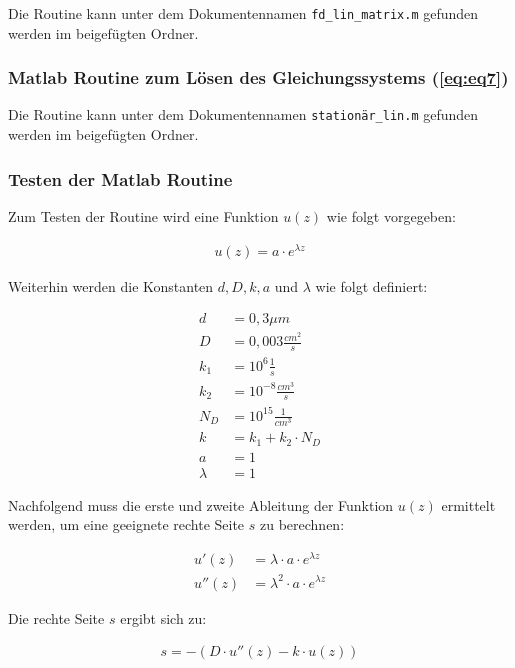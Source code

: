\documentclass[
	pagesize,
	fontsize=12pt,
	paper=a4,
	oneside,
   reqno
]{scrartcl}
\begin{document}
Die Routine kann unter dem Dokumentennamen \texttt{fd\_lin\_matrix.m} gefunden werden im beigefügten Ordner.

\subsubsection{Matlab Routine zum Lösen des Gleichungssystems (\autoref{eq:eq7})}

Die Routine kann unter dem Dokumentennamen \texttt{stationär\_lin.m} gefunden werden im beigefügten Ordner.

\subsubsection{Testen der Matlab Routine}

Zum Testen der Routine wird eine Funktion $u(z)$ wie folgt vorgegeben:

\begin{align*}
   u(z) = a \cdot e^{\lambda z}
\end{align*}

Weiterhin werden die Konstanten $d, D, k, a$ und $\lambda$ wie folgt definiert:

\begin{align*}
   d &= 0,3\mu m \\
   D &= 0,003 \frac{cm^2}{s} \\
   k_1 &= 10^6 \frac{1}{s} \\
   k_2 &= 10^{-8} \frac{cm^3}{s} \\
   N_D &= 10^{15} \frac{1}{cm^3} \\
   k &= k_1 + k_2 \cdot N_D \\
   a &= 1 \\
   \lambda &= 1
\end{align*}

Nachfolgend muss die erste und zweite Ableitung der Funktion $u(z)$ ermittelt werden, um eine geeignete rechte Seite $s$ zu berechnen:

\begin{align*}
   u'(z) &= \lambda \cdot a \cdot e^{\lambda z} \\
   u''(z) &= \lambda^2 \cdot a \cdot e^{\lambda z}
\end{align*}

Die rechte Seite $s$ ergibt sich zu:

\begin{align*}
   s = -\left( D \cdot u''(z) - k \cdot u(z) \right)
\end{align*}
\end{document}
